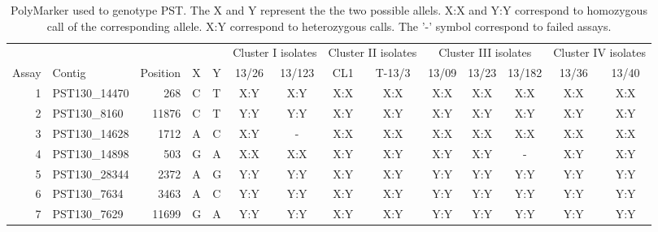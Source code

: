 
\begin{sidewaystable}
\centering
\caption{PolyMarker used to genotype PST. The X and Y represent the the two possible allels.  X:X and Y:Y correspond to homozygous call of the corresponding allele. X:Y correspond to heterozygous calls. The '-' symbol correspond to failed assays. }
\label{app:PolyMarkerPST}
\begin{localsize}{9}{10}

\begin{tabular}{rlrll|cc|cc|ccc|cc}
\toprule
          &              &  &  & & \multicolumn{2}{c}{Cluster I isolates}        & \multicolumn{2}{c}{Cluster II isolates}        & \multicolumn{3}{c}{Cluster III isolates}         & \multicolumn{2}{c}{Cluster IV isolates}        \\
Assay & Contig       & Position &  X &  Y & 13/26              & 13/123 & CL1                 & T-13/3 & 13/09                & 13/23 & 13/182 & 13/36               & 13/40 \\
 \midrule
  1  & PST130\_14470 & 268      & C        & T        & X:Y                & X:Y    & X:X                 & X:X    & X:X                  & X:X   & X:X    & X:X                 & X:X   \\
  2  & PST130\_8160  & 11876    & C        & T        & Y:Y                & Y:Y    & X:Y                 & X:Y    & X:Y                  & X:Y   & X:Y    & X:Y                 & X:Y   \\
  3  & PST130\_14628 & 1712     & A        & C        & X:Y                & -      & X:X                 & X:X    & X:X                  & X:X   & X:X    & X:X                 & X:X   \\
  4  & PST130\_14898 & 503      & G        & A        & X:X                & X:X    & X:Y                 & X:Y    & X:Y                  & X:Y   & -      & X:Y                 & X:Y   \\
  5  & PST130\_28344 & 2372     & A        & G        & Y:Y                & Y:Y    & X:Y                 & X:Y    & Y:Y                  & Y:Y   & Y:Y    & Y:Y                 & Y:Y   \\
  6  & PST130\_7634  & 3463     & A        & C        & Y:Y                & Y:Y    & X:Y                 & X:Y    & Y:Y                  & Y:Y   & Y:Y    & Y:Y                 & Y:Y   \\
  7  & PST130\_7629  & 11699    & G        & A        & Y:Y                & Y:Y    & X:Y                 & X:Y    & Y:Y                  & Y:Y   & Y:Y    & Y:Y                 & Y:Y   \\

\end{tabular}
\end{localsize}
\end{sidewaystable}
